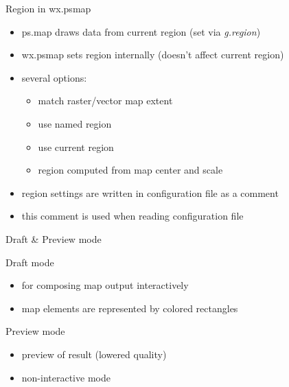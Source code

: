 \documentclass[xcolor=dvipsnames,beamer,compress]{beamer} %
\begin{document}
\begin{frame}{Region in wx.psmap}
\begin{itemize}
\item ps.map draws data from current region (set via \emph{g.region})
  \item wx.psmap sets region internally (doesn't affect current region)
  \item several options:
      \begin{itemize}
        \item match raster/vector map extent
        \item use named region
        \item use current region
        \item region computed from map center and scale
      \end{itemize}
  \item region settings are written in configuration file as a comment
\item this comment is used when reading configuration file
\end{itemize}

\end{frame}


\begin{frame}{Draft \& Preview mode}
\begin{block}{Draft mode}
\begin{itemize}
  \item for composing map output interactively
  \item map elements are represented by colored rectangles
\end{itemize}
\end{block}

\begin{block}{Preview mode}
\begin{itemize}
\item preview of result (lowered quality)
\item non-interactive mode
\end{itemize}
\end{block}
\end{frame}
\end{document}
